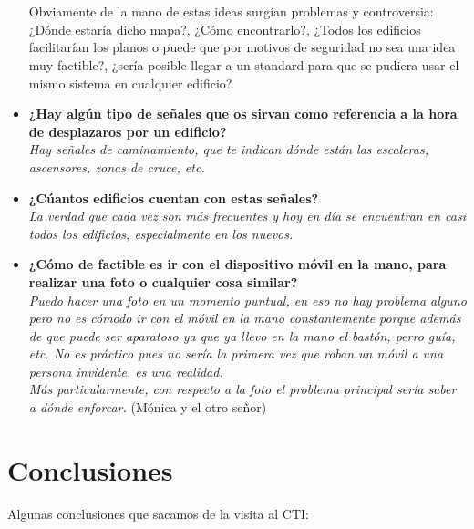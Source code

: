 \documentclass{article}
\begin{document}
\begin{itemize}
		\\ 
		\\
		Obviamente de la mano de estas ideas surgían problemas y controversia: ¿Dónde estaría dicho mapa?, ¿Cómo encontrarlo?, ¿Todos los edificios facilitarían los planos o puede que por motivos de seguridad no sea una idea muy factible?, ¿sería posible llegar a un standard para que se pudiera usar el mismo sistema en cualquier edificio?
		\\
		 
		\item \textbf{¿Hay algún tipo de señales que os sirvan como referencia a la hora de desplazaros por un edificio?}
		\\
		\textit{Hay señales de caminamiento, que te indican dónde están las escaleras, ascensores, zonas de cruce, etc.}
		\\
		\item \textbf{¿Cúantos edificios cuentan con estas señales?}
		\\
		\textit{La verdad que cada vez son más frecuentes y hoy en día se encuentran en casi todos los edificios, especialmente en los nuevos.}
		\\
		\item \textbf{¿Cómo de factible es ir con el dispositivo móvil en la mano, para realizar una foto o cualquier cosa similar?}
		\\
		\textit{Puedo hacer una foto en un momento puntual, en eso no hay problema alguno pero no es cómodo ir con el móvil en la mano constantemente porque además de que puede ser aparatoso ya que ya llevo en la mano el bastón, perro guía, etc. No es práctico pues no sería la primera vez que roban un móvil a una persona invidente, es una realidad. 
		\\
		Más particularmente, con respecto a la foto el problema principal sería saber a dónde enforcar.} 
		(Mónica y el otro señor)
		 
	\end{itemize}


	\section{Conclusiones}
	Algunas conclusiones que sacamos de la visita al CTI:
	
\end{document}
